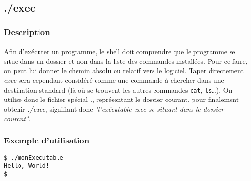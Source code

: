 \subsection{./exec}

\subsubsection*{Description}

\paragraph{} Afin d'exécuter un programme, le shell doit comprendre que le
programme se situe dans un dossier et non dans la liste des commandes
installées.  Pour ce faire, on peut lui donner le chemin absolu ou relatif vers
le logiciel. Taper directement \emph{exec} sera cependant considéré comme une
commande à chercher dans une destination standard (là où se trouvent les autres
commandes \texttt{cat}, \texttt{ls}\ldots).  On utilise donc le fichier spécial
\emph{.}, représentant le dossier courant, pour finalement obtenir
\emph{./exec}, signifiant donc \emph{"l'exécutable exec se situant dans le
	dossier courant"}.

\subsubsection*{Exemple d'utilisation}
\begin{lstlisting}
$ ./monExecutable
Hello, World!
$ 
\end{lstlisting}
